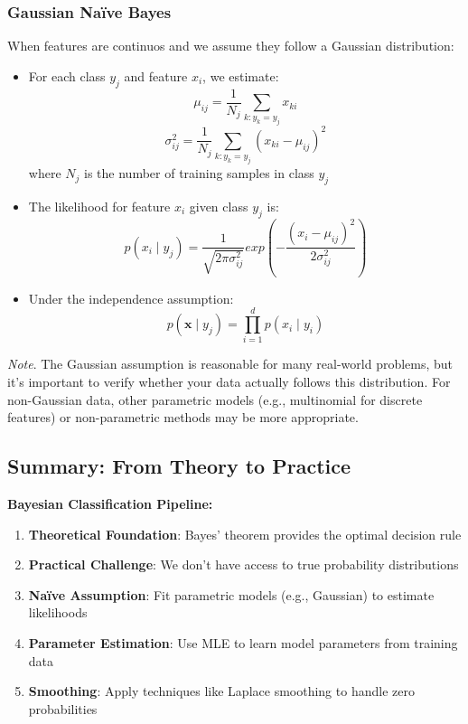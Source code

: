 \documentclass[a4paper]{article}
\theoremstyle{definition}
\begin{document}
\subsubsection{Gaussian Naïve Bayes}
When features are continuos and we assume they follow a Gaussian distribution:
\begin{itemize}
    \item For each class \( y_j \) and feature \( x_i \), we estimate:
    \[
      \mu_{ij} = \frac{1}{N_j} \sum_{k: y_k = y_j} x_{ki}
    \]
    \[
      \sigma_{ij}^2 = \frac{1}{N_j} \sum_{k: y_k = y_j} (x_{ki} - \mu_{ij})^2
    \]
    where \( N_j \) is the number of training samples in class \( y_j \)
    \item The likelihood for feature \( x_i \) given class \( y_j \) is:
    \[
      p(x_i \mid y_j) = \frac{1}{\sqrt{2\pi\sigma_{ij}^2}}exp(-\frac{(x_i - \mu_{ij})^2}{2\sigma_{ij}^2})
    \]
    \item Under the independence assumption:
    \[
      p(\mathbf{x}\mid y_j) = \prod_{i = 1}^d p(x_i\mid y_i)
    \]
\end{itemize}
\textit{Note}. The Gaussian assumption is reasonable for many real-world problems, but it's important to verify whether your data 
actually follows this distribution. For non-Gaussian data, other parametric models (e.g., multinomial for discrete features) or non-parametric 
methods may be more appropriate.
\subsection{Summary: From Theory to Practice}
\begin{tcolorbox}[
    colback=magenta!15!white,
    colframe=magenta!15!white,
    boxrule=0pt,
    arc=0pt,
    halign=center
]
    \textbf{Bayesian Classification Pipeline:}\\[0.3em]
    \begin{enumerate}
        \item \textbf{Theoretical Foundation}: Bayes' theorem provides the optimal decision rule
        \item \textbf{Practical Challenge}: We don't have access to true probability distributions
        \item \textbf{Naïve Assumption}: Fit parametric models (e.g., Gaussian) to estimate likelihoods 
        \item \textbf{Parameter Estimation}: Use MLE to learn model parameters from training data 
        \item \textbf{Smoothing}: Apply techniques like Laplace smoothing to handle zero probabilities
    \end{enumerate}
    
\end{tcolorbox}
\end{document}
